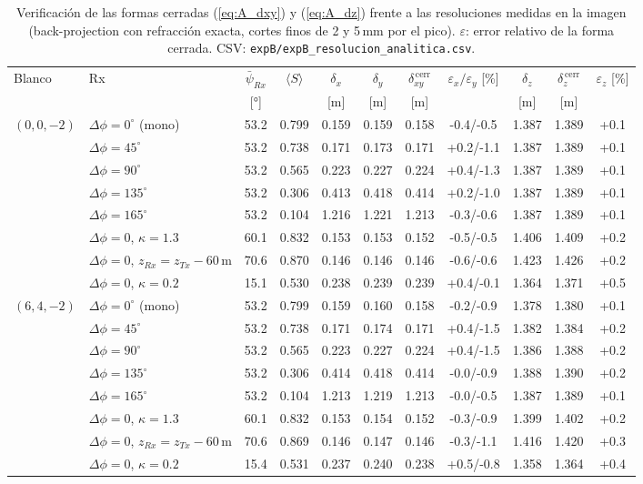 \begin{table}[H]
\centering\footnotesize\setlength{\tabcolsep}{3.6pt}
\caption{Verificación de las formas cerradas (\ref{eq:A_dxy}) y (\ref{eq:A_dz}) frente a las resoluciones medidas en la imagen (back-projection con refracción exacta, cortes finos de 2 y 5\,mm por el pico). $\varepsilon$: error relativo de la forma cerrada. CSV: \texttt{expB/expB\_resolucion\_analitica.csv}.}
\label{tab:A_verif}
\begin{tabular}{@{}llccccccccc@{}}
\toprule
Blanco & Rx & $\bar\psi_{Rx}$ & $\langle S\rangle$ & $\delta_x$ & $\delta_y$ & $\delta_{xy}^{\,\mathrm{cerr}}$ & $\varepsilon_x/\varepsilon_y$ [\%] & $\delta_z$ & $\delta_z^{\,\mathrm{cerr}}$ & $\varepsilon_z$ [\%] \\
 & & [°] & & [m] & [m] & [m] & & [m] & [m] & \\
\midrule
$(0,0,-2)$ & $\Delta\phi=0^{\circ}$ (mono) & 53.2 & 0.799 & 0.159 & 0.159 & 0.158 & -0.4/-0.5 & 1.387 & 1.389 & +0.1 \\
 & $\Delta\phi=45^{\circ}$ & 53.2 & 0.738 & 0.171 & 0.173 & 0.171 & +0.2/-1.1 & 1.387 & 1.389 & +0.1 \\
 & $\Delta\phi=90^{\circ}$ & 53.2 & 0.565 & 0.223 & 0.227 & 0.224 & +0.4/-1.3 & 1.387 & 1.389 & +0.1 \\
 & $\Delta\phi=135^{\circ}$ & 53.2 & 0.306 & 0.413 & 0.418 & 0.414 & +0.2/-1.0 & 1.387 & 1.389 & +0.1 \\
 & $\Delta\phi=165^{\circ}$ & 53.2 & 0.104 & 1.216 & 1.221 & 1.213 & -0.3/-0.6 & 1.387 & 1.389 & +0.1 \\
 & $\Delta\phi=0$, $\kappa=1.3$ & 60.1 & 0.832 & 0.153 & 0.153 & 0.152 & -0.5/-0.5 & 1.406 & 1.409 & +0.2 \\
 & $\Delta\phi=0$, $z_{Rx}=z_{Tx}-60$\,m & 70.6 & 0.870 & 0.146 & 0.146 & 0.146 & -0.6/-0.6 & 1.423 & 1.426 & +0.2 \\
 & $\Delta\phi=0$, $\kappa=0.2$ & 15.1 & 0.530 & 0.238 & 0.239 & 0.239 & +0.4/-0.1 & 1.364 & 1.371 & +0.5 \\
\midrule
$(6,4,-2)$ & $\Delta\phi=0^{\circ}$ (mono) & 53.2 & 0.799 & 0.159 & 0.160 & 0.158 & -0.2/-0.9 & 1.378 & 1.380 & +0.1 \\
 & $\Delta\phi=45^{\circ}$ & 53.2 & 0.738 & 0.171 & 0.174 & 0.171 & +0.4/-1.5 & 1.382 & 1.384 & +0.2 \\
 & $\Delta\phi=90^{\circ}$ & 53.2 & 0.565 & 0.223 & 0.227 & 0.224 & +0.4/-1.5 & 1.386 & 1.388 & +0.2 \\
 & $\Delta\phi=135^{\circ}$ & 53.2 & 0.306 & 0.414 & 0.418 & 0.414 & -0.0/-0.9 & 1.388 & 1.390 & +0.2 \\
 & $\Delta\phi=165^{\circ}$ & 53.2 & 0.104 & 1.213 & 1.219 & 1.213 & -0.0/-0.5 & 1.387 & 1.389 & +0.1 \\
 & $\Delta\phi=0$, $\kappa=1.3$ & 60.1 & 0.832 & 0.153 & 0.154 & 0.152 & -0.3/-0.9 & 1.399 & 1.402 & +0.2 \\
 & $\Delta\phi=0$, $z_{Rx}=z_{Tx}-60$\,m & 70.6 & 0.869 & 0.146 & 0.147 & 0.146 & -0.3/-1.1 & 1.416 & 1.420 & +0.3 \\
 & $\Delta\phi=0$, $\kappa=0.2$ & 15.4 & 0.531 & 0.237 & 0.240 & 0.238 & +0.5/-0.8 & 1.358 & 1.364 & +0.4 \\
\bottomrule
\end{tabular}
\end{table}
